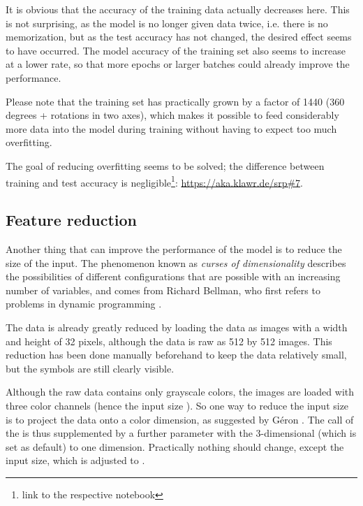 It is obvious that the accuracy of the training data actually decreases here.
This is not surprising, as the model is no longer given data twice, i.e. there is no memorization, but as the test accuracy has not changed, the desired effect seems to have occurred.
The model accuracy of the training set also seems to increase at a lower rate, so that more epochs or larger batches could already improve the performance.

Please note that the training set has practically grown by a factor of 1440 (360 degrees + rotations in two axes), which makes it possible to feed considerably more data into the model during training without having to expect too much overfitting.

The goal of reducing overfitting seems to be solved; the difference between training and test accuracy is negligible{\footnote{link to the respective notebook}: \url{https://aka.klawr.de/srp\#7}}.

\subsection{Feature reduction}

Another thing that can improve the performance of the model is to reduce the size of the input.
The phenomenon known as \textit{curses of dimensionality} describes the possibilities of different configurations that are possible with an increasing number of variables, and comes from Richard Bellman, who first refers to problems in dynamic programming \cite[p.ix]{Bellman1957}.

The data is already greatly reduced by loading the data as images with a width and height of 32 pixels, although the data is raw as 512 by 512 images. This reduction has been done manually beforehand to keep the data relatively small, but the symbols are still clearly visible.

Although the raw data contains only grayscale colors, the images are loaded with three color channels (hence the input size \code{[32, 32, 3]}).
So one way to reduce the input size is to project the data onto a color dimension, as suggested by Géron \cite[p.215]{Geron2019}.
The call of the  is thus supplemented by a further parameter  with the 3-dimensional  (which is set as default) to one dimension.
Practically nothing should change, except the input size, which is adjusted to \code{[32, 32, 1]}.

